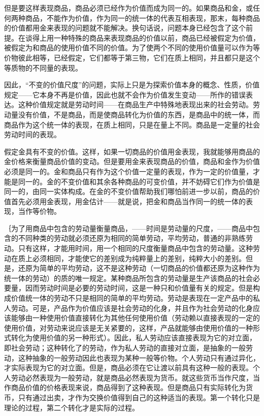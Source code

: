 但是要这样表现商品，商品必须已经作为价值而成为同一的。如果商品和金，或任何两种商品，不能作为价值，作为同一的统一体的代表互相表现，那末，每种商品的价值都用金来表现的问题就不能解决。换句话说，问题本身已经包含了这个前提。在谈得上用一种特殊的商品来表现商品的价值以前，商品已经被假定为价值，被假定为和商品的使用价值不同的价值。为了使两个不同的使用价值量可以作为等价物彼此相等，已经假定，它们都等于第三物，它们在质上相同，并且都只是这个等质物的不同量的表现。

因此，“不变的价值尺度”的问题，实际上只是为探索价值本身的概念、性质，价值规定——它本身不再是价值，因此也就不会作为价值发生变动——所作的错误表达。这种价值规定就是劳动时间——在商品生产中特殊地表现出来的社会劳动。劳动量没有价值，不是商品，而是使商品转化为价值的东西，是商品中的统一体，而商品作为这个统一体的表现，在质上相同，只是在量上不同。商品是一定量的社会劳动时间的表现。

假定金具有不变的价值。这样，如果一切商品的价值用金表现，我就能够用商品的金价格来衡量商品价值的变动。但是要用金来表现商品的价值，商品和金作为价值必须是同一的。金和商品只有作为这个价值一定量的表现，作为一定的价值量，才能是同一的。金的不变价值和其余各种商品的可变价值，并不妨碍它们作为价值是同一的，由同一实体构成。在金的不变价值帮助我们哪怕前进一步以前，商品的价值首先必须用金表现，用金估计——就是说，把金和商品当作同一的统一体的表现，当作等价物。

｛为了用商品中包含的劳动量衡量商品，——时间是劳动量的尺度，——商品中包含的不同种类的劳动就必须还原为相同的简单劳动，平均劳动，普通的非熟练劳动。只有这样，才能用时间，用一个相同的尺度衡量商品中包含的劳动量。这种劳动在质上必须相同，才能使它的差别成为纯粹量上的差别，纯粹大小的差别。但是，还原为简单的平均劳动，这不是这种劳动（一切商品的价值都还原为这种作为统一体的劳动）的质的唯一规定。某种商品所包含的劳动量是生产该商品的社会必要量，因而劳动时间是必要的劳动时间，这是一种只和价值量有关的规定。但是构成价值统一体的劳动不只是相同的简单的平均劳动。劳动是表现在一定产品中的私人劳动。可是，产品作为价值应该是社会劳动的化身，并且作为社会劳动的化身应该能够由一种使用价值直接转化为其他任何使用价值（劳动赖以直接表现的一定的使用价值，对劳动来说应该是无关紧要的，这样，产品就能够由使用价值的一种形式转化为使用价值的另一种形式）。因此，私人劳动应该直接表现为它的对立面，即社会劳动；这种转化了的劳动，作为私人劳动的直接对立面，是抽象的一般劳动，这种抽象的一般劳动因此也表现为某种一般等价物。个人劳动只有通过异化，才实际表现为它的对立面。但是，商品必须在它让渡以前具有这种一般的表现。个人劳动必然表现为一般劳动，就是商品必然表现为货币。就这些货币当作尺度，当作商品价值的价格表现来说，商品得到了这种表现。但是商品只有实际转化为货币，只有通过出卖，才作为交换价值得到自己的这种适当的表现。第一个转化只是理论的过程，第二个转化才是实际的过程。

